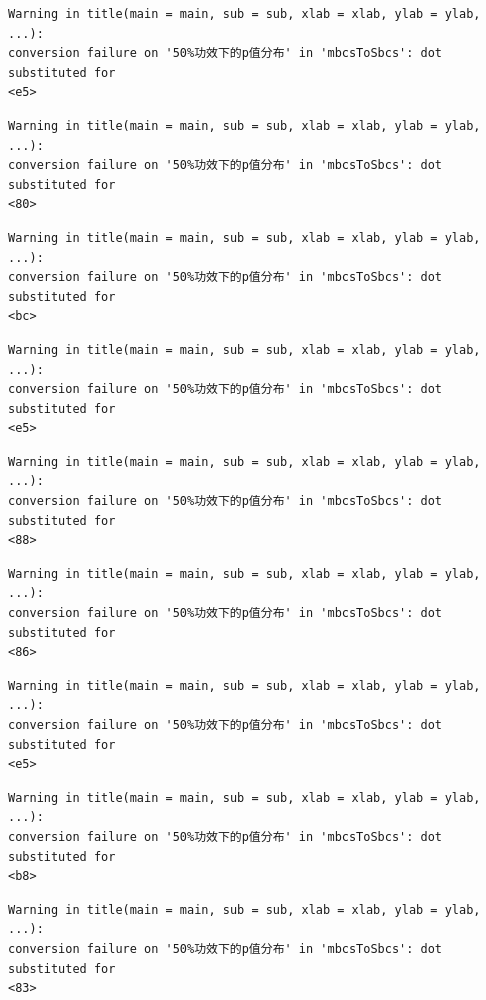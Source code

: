 \documentclass[
  letterpaper,
  DIV=11,
  numbers=noendperiod]{scrreprt}
\begin{document}
\begin{verbatim}
Warning in title(main = main, sub = sub, xlab = xlab, ylab = ylab, ...):
conversion failure on '50%功效下的p值分布' in 'mbcsToSbcs': dot substituted for
<e5>
\end{verbatim}

\begin{verbatim}
Warning in title(main = main, sub = sub, xlab = xlab, ylab = ylab, ...):
conversion failure on '50%功效下的p值分布' in 'mbcsToSbcs': dot substituted for
<80>
\end{verbatim}

\begin{verbatim}
Warning in title(main = main, sub = sub, xlab = xlab, ylab = ylab, ...):
conversion failure on '50%功效下的p值分布' in 'mbcsToSbcs': dot substituted for
<bc>
\end{verbatim}

\begin{verbatim}
Warning in title(main = main, sub = sub, xlab = xlab, ylab = ylab, ...):
conversion failure on '50%功效下的p值分布' in 'mbcsToSbcs': dot substituted for
<e5>
\end{verbatim}

\begin{verbatim}
Warning in title(main = main, sub = sub, xlab = xlab, ylab = ylab, ...):
conversion failure on '50%功效下的p值分布' in 'mbcsToSbcs': dot substituted for
<88>
\end{verbatim}

\begin{verbatim}
Warning in title(main = main, sub = sub, xlab = xlab, ylab = ylab, ...):
conversion failure on '50%功效下的p值分布' in 'mbcsToSbcs': dot substituted for
<86>
\end{verbatim}

\begin{verbatim}
Warning in title(main = main, sub = sub, xlab = xlab, ylab = ylab, ...):
conversion failure on '50%功效下的p值分布' in 'mbcsToSbcs': dot substituted for
<e5>
\end{verbatim}

\begin{verbatim}
Warning in title(main = main, sub = sub, xlab = xlab, ylab = ylab, ...):
conversion failure on '50%功效下的p值分布' in 'mbcsToSbcs': dot substituted for
<b8>
\end{verbatim}

\begin{verbatim}
Warning in title(main = main, sub = sub, xlab = xlab, ylab = ylab, ...):
conversion failure on '50%功效下的p值分布' in 'mbcsToSbcs': dot substituted for
<83>
\end{verbatim}
\end{document}
